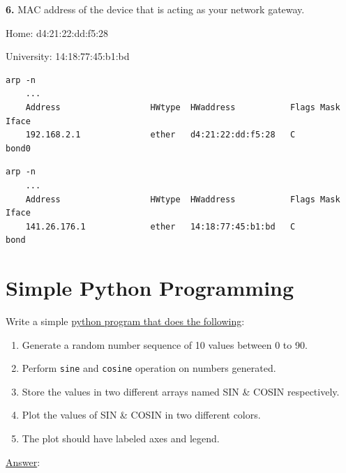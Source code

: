 \documentclass[12pt]{article}
\begin{document}
\textbf{6.} MAC address of the device that is acting as your network gateway.

Home: d4:21:22:dd:f5:28

University: 14:18:77:45:b1:bd 

\begin{lstlisting}[caption=arp home]
	arp -n
	...
	Address                  HWtype  HWaddress           Flags Mask            Iface
	192.168.2.1              ether   d4:21:22:dd:f5:28   C                     bond0
\end{lstlisting}

\begin{lstlisting}[caption=arp university]
	arp -n
	...
	Address                  HWtype  HWaddress           Flags Mask            Iface
	141.26.176.1             ether   14:18:77:45:b1:bd   C                     bond
\end{lstlisting}


\section{Simple Python Programming}

Write a simple \underline{python program that does the following}:
\begin{enumerate}
	\item Generate a random number sequence of 10 values between 0 to 90.
	\item Perform \texttt{sine} and \texttt{cosine} operation on numbers generated.
	\item Store the values in two different arrays named SIN \& COSIN respectively.
	\item Plot the values of SIN \& COSIN in two different colors.
	\item The plot should have labeled axes and legend.
\end{enumerate}

\underline{Answer}:

\lstset{language=python, breaklines=true, frame=single}

\end{document}
